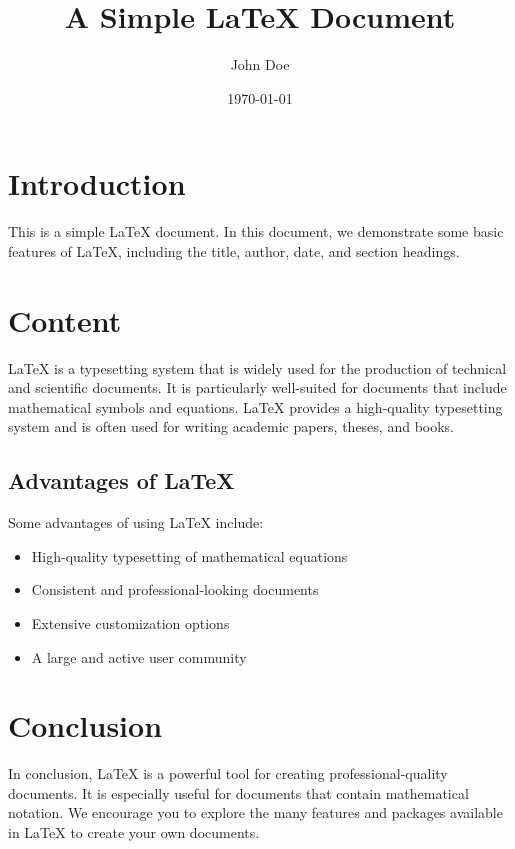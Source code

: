 \documentclass{article}
\title{A Simple LaTeX Document}
\author{John Doe}
\date{\today}
\begin{document}
\maketitle

\section{Introduction}
This is a simple LaTeX document. In this document, we demonstrate some basic features of LaTeX, including the title, author, date, and section headings.

\section{Content}
LaTeX is a typesetting system that is widely used for the production of technical and scientific documents. It is particularly well-suited for documents that include mathematical symbols and equations. LaTeX provides a high-quality typesetting system and is often used for writing academic papers, theses, and books.

\subsection{Advantages of LaTeX}
Some advantages of using LaTeX include:
\begin{itemize}
  \item High-quality typesetting of mathematical equations
  \item Consistent and professional-looking documents
  \item Extensive customization options
  \item A large and active user community
\end{itemize}

\section{Conclusion}
In conclusion, LaTeX is a powerful tool for creating professional-quality documents. It is especially useful for documents that contain mathematical notation. We encourage you to explore the many features and packages available in LaTeX to create your own documents.
\end{document}
